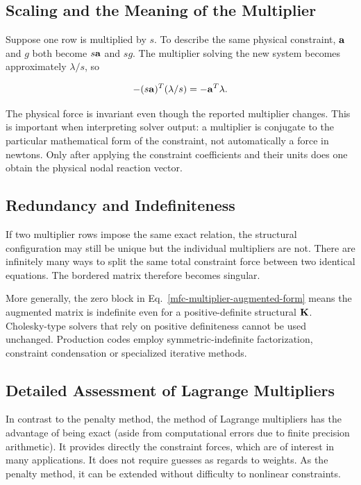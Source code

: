 \subsection{Scaling and the Meaning of the Multiplier}

Suppose one row is multiplied by $s$. To describe the same physical constraint,
$\mathbf{a}$ and $g$ both become $s\mathbf{a}$ and $sg$. The multiplier solving the new
system becomes approximately $\lambda/s$, so

\begin{equation}
    -(s\mathbf{a})^T(\lambda/s)=-\mathbf{a}^T\lambda.
\end{equation}

The physical force is invariant even though the reported multiplier changes.
This is important when interpreting solver output: a multiplier is conjugate to
the particular mathematical form of the constraint, not automatically a force
in newtons. Only after applying the constraint coefficients and their units does
one obtain the physical nodal reaction vector.

\subsection{Redundancy and Indefiniteness}

If two multiplier rows impose the same exact relation, the structural
configuration may still be unique but the individual multipliers are not. There
are infinitely many ways to split the same total constraint force between two
identical equations. The bordered matrix therefore becomes singular.

More generally, the zero block in Eq.~\eqref{mfc-multiplier-augmented-form}
means the augmented matrix is indefinite even for a positive-definite structural
$\mathbf{K}$. Cholesky-type solvers that rely on positive definiteness cannot be used
unchanged. Production codes employ symmetric-indefinite factorization,
constraint condensation or specialized iterative methods.

\subsection{Detailed Assessment of Lagrange Multipliers}

In contrast to the penalty method, the method of Lagrange multipliers has the
advantage of being exact (aside from computational errors due to finite
precision arithmetic). It provides directly the constraint forces, which are of
interest in many applications. It does not require guesses as regards to weights.
As the penalty method, it can be extended without difficulty to nonlinear constraints.

